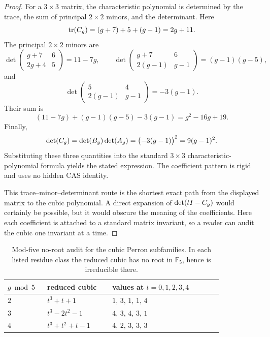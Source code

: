 \documentclass[11pt]{article}
\theoremstyle{remark}
\numberwithin{equation}{section}
\begin{document}
\begin{proof}
For a \(3\times 3\) matrix, the characteristic polynomial is determined by the
trace, the sum of principal \(2\times 2\) minors, and the determinant.  Here
\[
\operatorname{tr}(C_g)=(g+7)+5+(g-1)=2g+11.
\]
The principal \(2\times 2\) minors are
\[
\det\!\begin{pmatrix}g+7&6\\2g+4&5\end{pmatrix}=11-7g,
\qquad
\det\!\begin{pmatrix}g+7&6\\2(g-1)&g-1\end{pmatrix}=(g-1)(g-5),
\]
and
\[
\det\!\begin{pmatrix}5&4\\2(g-1)&g-1\end{pmatrix}=-3(g-1).
\]
Their sum is
\[
(11-7g)+(g-1)(g-5)-3(g-1)=g^2-16g+19.
\]
Finally,
\[
\det(C_g)=\det(B_g)\det(A_g)=\bigl(-3(g-1)\bigr)^2=9(g-1)^2.
\]
Substituting these three quantities into the standard \(3\times 3\)
characteristic-polynomial formula yields the stated expression.  The
coefficient pattern is rigid and uses no hidden CAS identity.
\par
This trace--minor--determinant route is the shortest exact path from the
displayed matrix to the cubic polynomial.  A direct expansion of
\(\det(tI-C_g)\) would certainly be possible, but it would obscure the meaning
of the coefficients.  Here each coefficient is attached to a standard matrix
invariant, so a reader can audit the cubic one invariant at a time.
\end{proof}

\begin{table}[t]
\centering
\small
\begin{tabular}{p{0.14\linewidth}p{0.26\linewidth}p{0.44\linewidth}}
\toprule
\(g \bmod 5\) & reduced cubic & values at \(t=0,1,2,3,4\) \\
\midrule
\(2\) & \(t^3+t+1\) & \(1,\,3,\,1,\,1,\,4\) \\
\(3\) & \(t^3-2t^2-1\) & \(4,\,3,\,4,\,3,\,1\) \\
\(4\) & \(t^3+t^2+t-1\) & \(4,\,2,\,3,\,3,\,3\) \\
\bottomrule
\end{tabular}
\caption{Mod-five no-root audit for the cubic Perron subfamilies.  In each listed residue class the reduced cubic has no root in \(\mathbb F_5\), hence is irreducible there.}
\label{tab:mod5}
\end{table}
\end{document}
